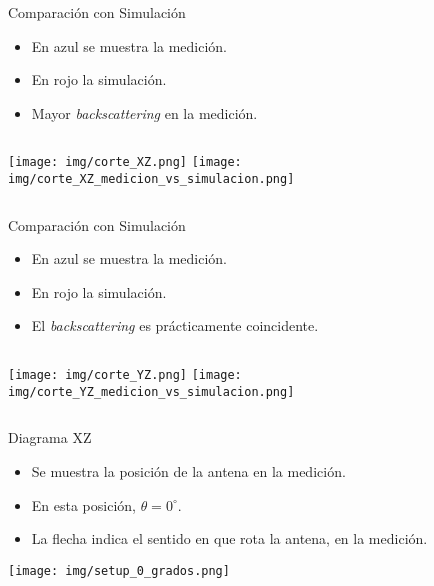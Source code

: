 \begin{frame}{Comparación con Simulación}
\begin{itemize}
    \item En {\color{blue}azul} se muestra la medición.
    \item En {\color{red}rojo} la simulación.
    \item Mayor \textit{backscattering} en la medición.
\end{itemize}
\begin{columns}
        \texttt{[image: img/corte\_XZ.png]}
        \texttt{[image: img/corte\_XZ\_medicion\_vs\_simulacion.png]}
\end{columns}
\end{frame}

\begin{frame}{Comparación con Simulación}
\begin{itemize}
    \item En {\color{blue}azul} se muestra la medición.
    \item En {\color{red}rojo} la simulación.
    \item El \textit{backscattering} es prácticamente coincidente.
\end{itemize}
\begin{columns}
        \texttt{[image: img/corte\_YZ.png]}
        \texttt{[image: img/corte\_YZ\_medicion\_vs\_simulacion.png]}
\end{columns}
\end{frame}

\begin{frame}{Diagrama XZ}

\begin{itemize}
    \item<1-> Se muestra la posición de la antena en la medición.
    \item<3-> En esta posición, $\theta = 0^{\circ}$.
    \item<4-> La flecha indica el sentido en que rota la antena, en la medición.
\end{itemize}

\begin{center}
    \texttt{[image: img/setup\_0\_grados.png]}
\end{center}
    
\end{frame}

